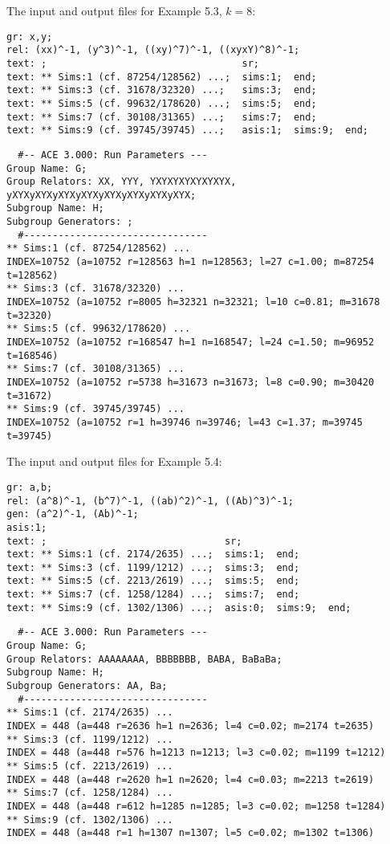 The input and output files for Example 5.3, $k=8$:

\bv\begin{verbatim}
gr: x,y;
rel: (xx)^-1, (y^3)^-1, ((xy)^7)^-1, ((xyxY)^8)^-1;
text: ;                                  sr;
text: ** Sims:1 (cf. 87254/128562) ...;  sims:1;  end;
text: ** Sims:3 (cf. 31678/32320) ...;   sims:3;  end;
text: ** Sims:5 (cf. 99632/178620) ...;  sims:5;  end;
text: ** Sims:7 (cf. 30108/31365) ...;   sims:7;  end;
text: ** Sims:9 (cf. 39745/39745) ...;   asis:1;  sims:9;  end;
\end{verbatim}\ev

\bv\begin{verbatim}
  #-- ACE 3.000: Run Parameters ---
Group Name: G;
Group Relators: XX, YYY, YXYXYXYXYXYXYX, yXYXyXYXyXYXyXYXyXYXyXYXyXYXyXYX;
Subgroup Name: H;
Subgroup Generators: ;
  #--------------------------------
** Sims:1 (cf. 87254/128562) ...
INDEX=10752 (a=10752 r=128563 h=1 n=128563; l=27 c=1.00; m=87254 t=128562)
** Sims:3 (cf. 31678/32320) ...
INDEX=10752 (a=10752 r=8005 h=32321 n=32321; l=10 c=0.81; m=31678 t=32320)
** Sims:5 (cf. 99632/178620) ...
INDEX=10752 (a=10752 r=168547 h=1 n=168547; l=24 c=1.50; m=96952 t=168546)
** Sims:7 (cf. 30108/31365) ...
INDEX=10752 (a=10752 r=5738 h=31673 n=31673; l=8 c=0.90; m=30420 t=31672)
** Sims:9 (cf. 39745/39745) ...
INDEX=10752 (a=10752 r=1 h=39746 n=39746; l=43 c=1.37; m=39745 t=39745)
\end{verbatim}\ev

The input and output files for Example 5.4:

\bv\begin{verbatim}
gr: a,b;
rel: (a^8)^-1, (b^7)^-1, ((ab)^2)^-1, ((Ab)^3)^-1;
gen: (a^2)^-1, (Ab)^-1;
asis:1;
text: ;                               sr;
text: ** Sims:1 (cf. 2174/2635) ...;  sims:1;  end;
text: ** Sims:3 (cf. 1199/1212) ...;  sims:3;  end;
text: ** Sims:5 (cf. 2213/2619) ...;  sims:5;  end;
text: ** Sims:7 (cf. 1258/1284) ...;  sims:7;  end;
text: ** Sims:9 (cf. 1302/1306) ...;  asis:0;  sims:9;  end;
\end{verbatim}\ev

\bv\begin{verbatim}
  #-- ACE 3.000: Run Parameters ---
Group Name: G;
Group Relators: AAAAAAAA, BBBBBBB, BABA, BaBaBa;
Subgroup Name: H;
Subgroup Generators: AA, Ba;
  #--------------------------------
** Sims:1 (cf. 2174/2635) ...
INDEX = 448 (a=448 r=2636 h=1 n=2636; l=4 c=0.02; m=2174 t=2635)
** Sims:3 (cf. 1199/1212) ...
INDEX = 448 (a=448 r=576 h=1213 n=1213; l=3 c=0.02; m=1199 t=1212)
** Sims:5 (cf. 2213/2619) ...
INDEX = 448 (a=448 r=2620 h=1 n=2620; l=4 c=0.03; m=2213 t=2619)
** Sims:7 (cf. 1258/1284) ...
INDEX = 448 (a=448 r=612 h=1285 n=1285; l=3 c=0.02; m=1258 t=1284)
** Sims:9 (cf. 1302/1306) ...
INDEX = 448 (a=448 r=1 h=1307 n=1307; l=5 c=0.02; m=1302 t=1306)
\end{verbatim}\ev

